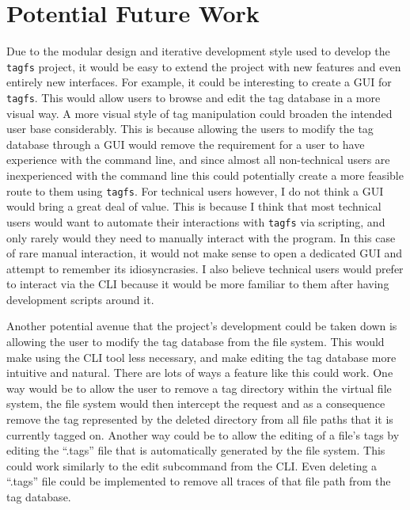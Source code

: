 \section{Potential Future Work}


Due to the modular design and iterative development style used to develop the
\texttt{tagfs} project, it would be easy to extend the project with new
features and even entirely new interfaces. For example, it could be interesting
to create a GUI for \texttt{tagfs}. This would allow users to browse and edit
the tag database in a more visual way. A more visual style of tag manipulation
could broaden the intended user base considerably. This is because allowing the
users to modify the tag database through a GUI would remove the requirement for
a user to have experience with the command line, and since almost all
non-technical users are inexperienced with the command line this could
potentially create a more feasible route to them using \texttt{tagfs}. For
technical users however, I do not think a GUI would bring a great deal of
value. This is because I think that most technical users would want to automate
their interactions with \texttt{tagfs} via scripting, and only rarely would
they need to manually interact with the program. In this case of rare manual
interaction, it would not make sense to open a dedicated GUI and attempt to
remember its idiosyncrasies. I also believe technical users would prefer to
interact via the CLI because it would be more familiar to them after having
development scripts around it.

Another potential avenue that the project's development could be taken down is
allowing the user to modify the tag database from the file system. This would
make using the CLI tool less necessary, and make editing the tag database more
intuitive and natural. There are lots of ways a feature like this could work.
One way would be to allow the user to remove a tag directory within the virtual
file system, the file system would then intercept the request and as a
consequence remove the tag represented by the deleted directory from all file
paths that it is currently tagged on. Another way could be to allow the editing
of a file's tags by editing the ``.tags'' file that is automatically generated
by the file system. This could work similarly to the edit subcommand from the
CLI. Even deleting a ``.tags'' file could be implemented to remove all traces
of that file path from the tag database.

